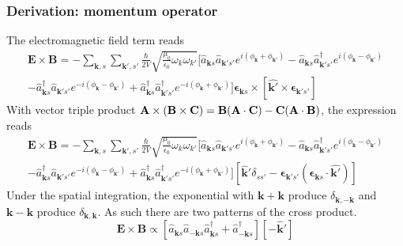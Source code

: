 \documentclass[../../../main.tex]{subfiles}
\begin{document}
\subsubsection{Derivation: momentum operator}
The electromagnetic field term reads
\begin{multline*}
  \mathbf{E }\times \mathbf{B}
  = - \sum_{\mathbf{k },s} \sum_{\mathbf{k }',s'}  \frac{\hbar  }{2V} \sqrt{\frac{\mu_0 }{\epsilon_0 }\omega_k \omega_{k'}}
  \bigg[ \hat{a}_{\mathbf{k }s} \hat{a}_{\mathbf{k }'s'}  e ^{i(\phi_{\mathbf{k }} +\phi_{\mathbf{k }'})}
    -\hat{a}_{\mathbf{k }s} \hat{a}^\dagger_{\mathbf{k }'s'} e ^{i(\phi_{\mathbf{k }}-\phi_{\mathbf{k }'})} \\
    -\hat{a}_{\mathbf{k }s} ^\dagger\hat{a}_{\mathbf{k }'s'} e ^{-i(\phi_{\mathbf{k }}-\phi_{\mathbf{k }'})}
    +\hat{a}^\dagger_{\mathbf{k }s} \hat{a}^\dagger_{\mathbf{k }'s'} e ^{-i(\phi_{\mathbf{k }}+\phi_{\mathbf{k }'})} \bigg]
  \boldsymbol{\epsilon}_{\mathbf{k}s} \times \left[ \hat{\mathbf{k }'}\times \boldsymbol{\epsilon}_{\mathbf{k }'s'}  \right]
\end{multline*}
With vector triple product $    \mathbf{A} \times (\mathbf{B} \times \mathbf{C}) = \mathbf{B}(\mathbf{A} \cdot \mathbf{C}) - \mathbf{C}(\mathbf{A} \cdot \mathbf{B})$,  the expression reads
\begin{multline*}
  \mathbf{E }\times \mathbf{B}
  = - \sum_{\mathbf{k },s} \sum_{\mathbf{k }',s'}  \frac{\hbar  }{2V} \sqrt{\frac{\mu_0 }{\epsilon_0 }\omega_k \omega_{k'}}
  \bigg[ \hat{a}_{\mathbf{k }s} \hat{a}_{\mathbf{k }'s'}  e ^{i(\phi_{\mathbf{k }} +\phi_{\mathbf{k }'})}
    -\hat{a}_{\mathbf{k }s} \hat{a}^\dagger_{\mathbf{k }'s'} e ^{i(\phi_{\mathbf{k }}-\phi_{\mathbf{k }'})} \\
    -\hat{a}_{\mathbf{k }s} ^\dagger\hat{a}_{\mathbf{k }'s'} e ^{-i(\phi_{\mathbf{k }}-\phi_{\mathbf{k }'})}
    +\hat{a}^\dagger_{\mathbf{k }s} \hat{a}^\dagger_{\mathbf{k }'s'} e ^{-i(\phi_{\mathbf{k }}+\phi_{\mathbf{k }'})} \bigg]
  \left[ \hat{\mathbf{k}}'\delta_{ss'}-\boldsymbol{\epsilon}_{\mathbf{k}'s'}\left( \boldsymbol{\epsilon}_{\mathbf{k }s}\cdot \hat{\mathbf{k}'} \right) \right]
\end{multline*}
Under the spatial integration, the exponential with $\mathbf{k }+\mathbf{k}$ produce $\delta_{\mathbf{k },-\mathbf{k}}$ and $\mathbf{k }-\mathbf{k}$ produce $\delta_{\mathbf{k },\mathbf{k}}$.
As  such there are two patterns of the cross product.
\begin{equation*}
  \mathbf{E }\times \mathbf{B}  \propto
  \left[ \hat{a}_{\mathbf{k }s} \hat{a}_{-\mathbf{k }s}  \hat{a}^\dagger_{\mathbf{k }s}+ \hat{a}^\dagger_{-\mathbf{k }s} \right] \left[ -\mathbf{\hat{k}}' \right]
\end{equation*}
\end{document}
